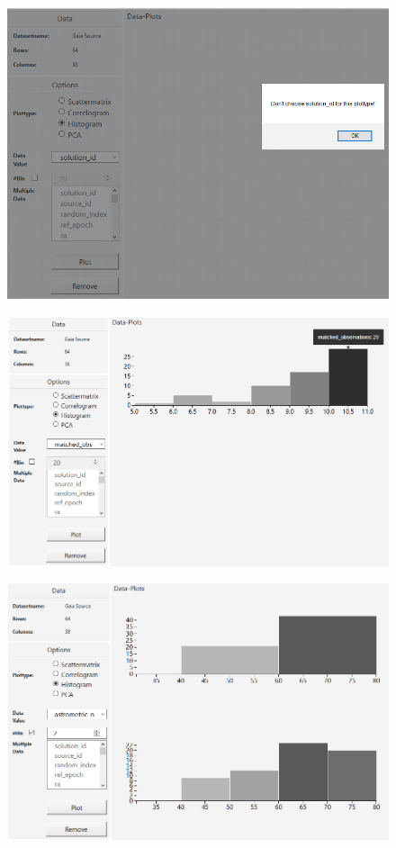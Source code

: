 \documentclass{article}
\begin{document}
\begin{figure}[!h]
\centering
\includegraphics[width=1\textwidth]{images/m3/histogram_err1.PNG}
\label{fig2}
\end{figure}

\begin{figure}[!h]
\centering
\includegraphics[width=1\textwidth]{images/m3/histogram1.PNG}
\label{fig3}
\end{figure}

\begin{figure}[!h]
\centering
\includegraphics[width=1\textwidth]{images/m3/histogram2.PNG}
\label{fig4}
\end{figure}
\end{document}
